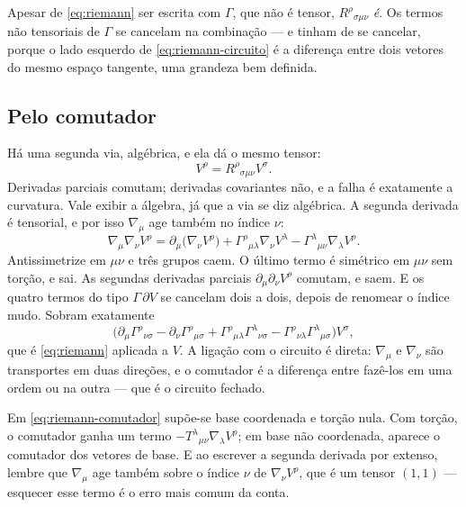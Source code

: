 \documentclass[12pt,a4paper,oneside]{book}
\theoremstyle{rgplain}
\theoremstyle{rgremark}
\begin{document}
\begin{atencao}
Apesar de \eqref{eq:riemann} ser escrita com $\Gamma$, que não é tensor,
$R^\rho{}_{\sigma\mu\nu}$ \emph{é}. Os termos não tensoriais de $\Gamma$ se
cancelam na combinação --- e tinham de se cancelar, porque o lado esquerdo de
\eqref{eq:riemann-circuito} é a diferença entre dois vetores do mesmo espaço
tangente, uma grandeza bem definida.
\end{atencao}

\subsection*{Pelo comutador}

Há uma segunda via, algébrica, e ela dá o mesmo tensor:
\begin{equation}
  [\nabla_\mu,\nabla_\nu]V^\rho=R^\rho{}_{\sigma\mu\nu}V^\sigma .
  \label{eq:riemann-comutador}
\end{equation}
Derivadas parciais comutam; derivadas covariantes não, e a falha é exatamente
a curvatura. Vale exibir a álgebra, já que a via se diz algébrica. A segunda
derivada é tensorial, e por isso $\nabla_\mu$ age também no índice $\nu$:
\[
  \nabla_\mu\nabla_\nu V^\rho
  =\partial_\mu\bigl(\nabla_\nu V^\rho\bigr)
  +\Gamma^\rho{}_{\mu\lambda}\nabla_\nu V^\lambda
  -\Gamma^\lambda{}_{\mu\nu}\nabla_\lambda V^\rho .
\]
Antissimetrize em $\mu\nu$ e três grupos caem. O último termo é simétrico em
$\mu\nu$ sem torção, e sai. As segundas derivadas parciais
$\partial_\mu\partial_\nu V^\rho$ comutam, e saem. E os quatro termos do
tipo $\Gamma\,\partial V$ se cancelam dois a dois, depois de renomear o
índice mudo. Sobram exatamente
\[
  \bigl(\partial_\mu\Gamma^\rho{}_{\nu\sigma}
  -\partial_\nu\Gamma^\rho{}_{\mu\sigma}
  +\Gamma^\rho{}_{\mu\lambda}\Gamma^\lambda{}_{\nu\sigma}
  -\Gamma^\rho{}_{\nu\lambda}\Gamma^\lambda{}_{\mu\sigma}\bigr)V^\sigma ,
\]
que é \eqref{eq:riemann} aplicada a $V$. A ligação com o circuito é direta: $\nabla_\mu$ e $\nabla_\nu$
são transportes em duas direções, e o comutador é a diferença entre fazê-los
em uma ordem ou na outra --- que é o circuito fechado.

\begin{atencao}
Em \eqref{eq:riemann-comutador} supõe-se base coordenada e torção nula. Com
torção, o comutador ganha um termo $-T^\lambda{}_{\mu\nu}\nabla_\lambda V^\rho$;
em base não coordenada, aparece o comutador dos vetores de base. E ao escrever
a segunda derivada por extenso, lembre que $\nabla_\mu$ age também sobre o
índice $\nu$ de $\nabla_\nu V^\rho$, que é um tensor $(1,1)$ --- esquecer esse
termo é o erro mais comum da conta.
\end{atencao}
\end{document}
